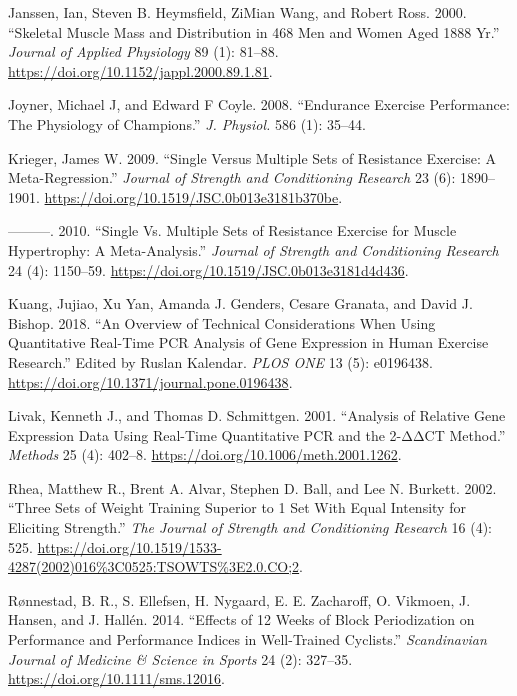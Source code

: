 \documentclass[
  letterpaper,
  DIV=11,
  numbers=noendperiod]{scrreprt}
\newlength{\cslhangindent}
\newenvironment{CSLReferences}[2] %
 {\begin{list}{}{%
  \setlength{\itemindent}{0pt}
  \setlength{\leftmargin}{0pt}
  \setlength{\parsep}{0pt}
  \ifodd #1
   \setlength{\leftmargin}{\cslhangindent}
   \setlength{\itemindent}{-1\cslhangindent}
  \fi
  \setlength{\itemsep}{#2\baselineskip}}}
 {\end{list}}
\begin{document}
\begin{CSLReferences}{1}{0}
Janssen, Ian, Steven B. Heymsfield, ZiMian Wang, and Robert Ross. 2000.
{``Skeletal Muscle Mass and Distribution in 468 Men and Women Aged
18{\textendash}88 Yr.''} \emph{Journal of Applied Physiology} 89 (1):
81--88. \url{https://doi.org/10.1152/jappl.2000.89.1.81}.

Joyner, Michael J, and Edward F Coyle. 2008. {``Endurance Exercise
Performance: The Physiology of Champions.''} \emph{J. Physiol.} 586 (1):
35--44.

Krieger, James W. 2009. {``Single Versus Multiple Sets of Resistance
Exercise: A Meta-Regression.''} \emph{Journal of Strength and
Conditioning Research} 23 (6): 1890--1901.
\url{https://doi.org/10.1519/JSC.0b013e3181b370be}.

---------. 2010. {``Single Vs. Multiple Sets of Resistance Exercise for
Muscle Hypertrophy: A Meta-Analysis.''} \emph{Journal of Strength and
Conditioning Research} 24 (4): 1150--59.
\url{https://doi.org/10.1519/JSC.0b013e3181d4d436}.

Kuang, Jujiao, Xu Yan, Amanda J. Genders, Cesare Granata, and David J.
Bishop. 2018. {``An Overview of Technical Considerations When Using
Quantitative Real-Time PCR Analysis of Gene Expression in Human Exercise
Research.''} Edited by Ruslan Kalendar. \emph{PLOS ONE} 13 (5):
e0196438. \url{https://doi.org/10.1371/journal.pone.0196438}.

Livak, Kenneth J., and Thomas D. Schmittgen. 2001. {``Analysis of
Relative Gene Expression Data Using Real-Time Quantitative PCR and the
2{-}ΔΔCT Method.''} \emph{Methods} 25 (4): 402--8.
\url{https://doi.org/10.1006/meth.2001.1262}.

Rhea, Matthew R., Brent A. Alvar, Stephen D. Ball, and Lee N. Burkett.
2002. {``Three Sets of Weight Training Superior to 1 Set With Equal
Intensity for Eliciting Strength.''} \emph{The Journal of Strength and
Conditioning Research} 16 (4): 525.
\url{https://doi.org/10.1519/1533-4287(2002)016\%3C0525:TSOWTS\%3E2.0.CO;2}.

Rønnestad, B. R., S. Ellefsen, H. Nygaard, E. E. Zacharoff, O. Vikmoen,
J. Hansen, and J. Hallén. 2014. {``Effects of 12 Weeks of Block
Periodization on Performance and Performance Indices in Well{-}Trained
Cyclists.''} \emph{Scandinavian Journal of Medicine \& Science in
Sports} 24 (2): 327--35. \url{https://doi.org/10.1111/sms.12016}.


\end{CSLReferences}
\end{document}
